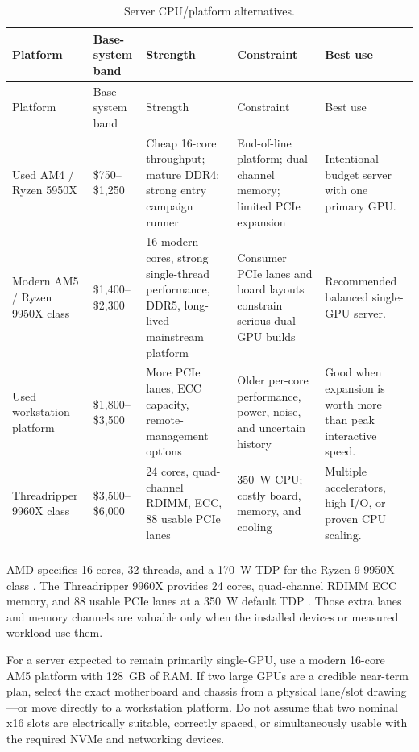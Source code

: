 \documentclass[11pt]{article}
\begin{document}
\begin{longtable}{L{0.16\textwidth} L{0.14\textwidth} L{0.16\textwidth} L{0.20\textwidth} L{0.16\textwidth}}
\toprule
Platform & Base-system band & Strength & Constraint & Best use \\
\midrule
\endfirsthead
\toprule
Platform & Base-system band & Strength & Constraint & Best use \\
\midrule
\endhead
Used AM4 / Ryzen 5950X & \$750--\$1,250 & Cheap 16-core throughput; mature DDR4; strong entry campaign runner & End-of-line platform; dual-channel memory; limited PCIe expansion & Intentional budget server with one primary GPU. \\
Modern AM5 / Ryzen 9950X class & \$1,400--\$2,300 & 16 modern cores, strong single-thread performance, DDR5, long-lived mainstream platform & Consumer PCIe lanes and board layouts constrain serious dual-GPU builds & Recommended balanced single-GPU server. \\
Used workstation platform & \$1,800--\$3,500 & More PCIe lanes, ECC capacity, remote-management options & Older per-core performance, power, noise, and uncertain history & Good when expansion is worth more than peak interactive speed. \\
Threadripper 9960X class & \$3,500--\$6,000 & 24 cores, quad-channel RDIMM, ECC, 88 usable PCIe lanes & 350~W CPU; costly board, memory, and cooling & Multiple accelerators, high I/O, or proven CPU scaling. \\
\bottomrule
\caption{Server CPU/platform alternatives.}
\end{longtable}

AMD specifies 16 cores, 32 threads, and a 170~W TDP for the Ryzen 9 9950X
class \cite{amd_9950x}. The Threadripper 9960X provides 24 cores, quad-channel
RDIMM ECC memory, and 88 usable PCIe lanes at a 350~W default TDP
\cite{amd_9960x}. Those extra lanes and memory channels are valuable only when
the installed devices or measured workload use them.

\begin{decisionbox}
For a server expected to remain primarily single-GPU, use a modern 16-core AM5
platform with 128~GB of RAM. If two large GPUs are a credible near-term plan,
select the exact motherboard and chassis from a physical lane/slot drawing---or
move directly to a workstation platform. Do not assume that two nominal x16
slots are electrically suitable, correctly spaced, or simultaneously usable
with the required NVMe and networking devices.
\end{decisionbox}
\end{document}
